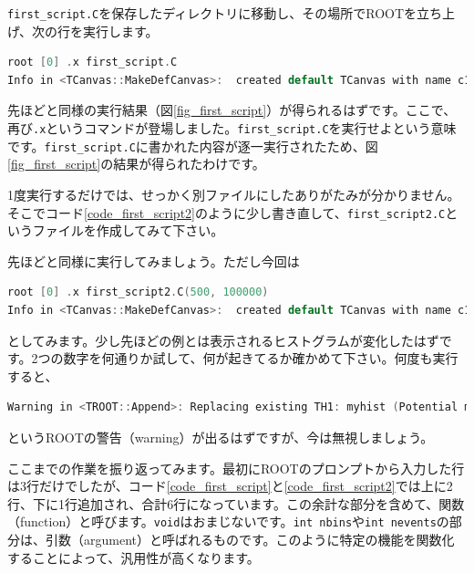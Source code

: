 \texttt{first\_script.C}を保存したディレクトリに移動し、その場所でROOTを立ち上げ、次の行を実行します。
\begin{lstlisting}[language=c++]
root [0] .x first_script.C
Info in <TCanvas::MakeDefCanvas>:  created default TCanvas with name c1
\end{lstlisting}
先ほどと同様の実行結果（図\ref{fig_first_script}）が得られるはずです。ここで、再び\texttt{.x}というコマンドが登場しました。\texttt{first\_script.C}を実行せよという意味です。\texttt{first\_script.C}に書かれた内容が逐一実行されたため、図\ref{fig_first_script}の結果が得られたわけです。

1度実行するだけでは、せっかく別ファイルにしたありがたみが分かりません。そこでコード\ref{code_first_script2}のように少し書き直して、\texttt{first\_script2.C}というファイルを作成してみて下さい。

先ほどと同様に実行してみましょう。ただし今回は
\begin{lstlisting}[language=c++]
root [0] .x first_script2.C(500, 100000)
Info in <TCanvas::MakeDefCanvas>:  created default TCanvas with name c1
\end{lstlisting}
としてみます。少し先ほどの例とは表示されるヒストグラムが変化したはずです。2つの数字を何通りか試して、何が起きてるか確かめて下さい。何度も実行すると、
\begin{lstlisting}[language=c++]
Warning in <TROOT::Append>: Replacing existing TH1: myhist (Potential memory leak).
\end{lstlisting}
というROOTの警告（warning）が出るはずですが、今は無視しましょう。

ここまでの作業を振り返ってみます。最初にROOTのプロンプトから入力した行は3行だけでしたが、コード\ref{code_first_script}と\ref{code_first_script2}では上に2行、下に1行追加され、合計6行になっています。この余計な部分を含めて、関数（function）と呼びます。\texttt{void}はおまじないです。\texttt{int nbins}や\texttt{int nevents}の部分は、引数（argument）と呼ばれるものです。このように特定の機能を関数化することによって、汎用性が高くなります。


